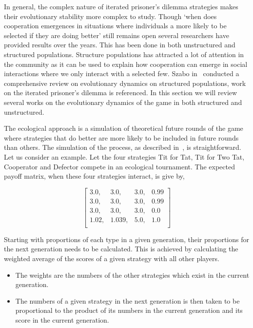 \documentclass{article}
\theoremstyle{definition}
\begin{document}
In general, the complex nature of iterated prisoner's dilemma strategies makes their
evolutionary stability more complex to study. Though `when does cooperation emergences
in situations where individuals a more likely to be selected if they are doing
better' still remains open several researchers have provided
results over the years. This has been done in both unstructured and
structured populations. Structure populations has attracted a lot of attention in
the community as it can be used to explain how cooperation can emerge in social
interactions where we only interact with a selected few.
Szabo in~\cite{szabo2007}  conducted a comprehensive review on evolutionary
dynamics on structured populations, work on the iterated prisoner's dilemma is referenced. In this
section we will review  several works on the evolutionary dynamics of the game
in both structured and unstructured.

The ecological approach is a simulation of theoretical future rounds of the game where strategies
that do better are more likely to be included in future rounds than others.
The simulation of the process, as described in~\cite{Axelrod1980b}, is straightforward.
Let us consider an example. Let the four strategies Tit for Tat, Tit for Two Tat,
Cooperator and Defector compete in an ecological tournament.
The expected payoff matrix, when these four strategies interact, is give by,

\[\begin{bmatrix}
    3.0,  & 3.0,  & 3.0, & 0.99 \\
    3.0,  & 3.0,  & 3.0, & 0.99 \\
    3.0,  & 3.0,  & 3.0, & 0.0  \\
    1.02, & 1.039,& 5.0, & 1.0 \\
\end{bmatrix}\]

Starting with proportions of each type in a given generation, their proportions
for the next generation needs to be calculated. This is achieved by calculating
the weighted average of the scores of a given strategy with all other players.


\begin{itemize}
    \item The weights are the numbers of the other strategies which
    exist in the current generation.
    \item The numbers of a given strategy in the next generation is then taken to
    be proportional to the product of its numbers in the current generation and
    its score in the current generation.
\end{itemize}
\end{document}
